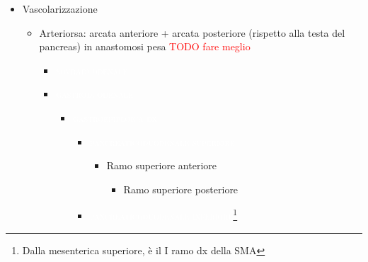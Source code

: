 \documentclass[italian,]{article}
\providecommand{\tightlist}{%
  \setlength{\itemsep}{0pt}\setlength{\parskip}{0pt}}
\newcommand{\mus}[1]{\colorbox{Salmon}{\textcolor{white}{\textsc{#1}}}}
\newcommand{\art}[1]{\colorbox{RedOrange}{\textcolor{white}{\textsc{#1}}}}
\renewcommand{\a}[1]{\underline{\textsc{#1}}}
\newcommand{\TODO}[1]{\textcolor{red}{\textsf{\footnotesize{TODO #1}}}} %
\begin{document}
\begin{itemize}
\begin{itemize}
    \begin{itemize}
    \tightlist
    \item
      \textbf{compasso aorto-mesenterico}: il duodeno passa tra
      \art{mesenterica superiore} e \art{aorta addominale}
    \end{itemize}
  \item
    \textbf{Porzione ascendente}

    \begin{itemize}
    \tightlist
    \item
      Fessura duodenodigiunale mantenuta in situ da un apparato
      sospensore, costituito principalmente dal
      \mus{muscolo di treiz}\footnote{Fibrocellule di provenienza
        diaframmatica che si attccano cranialmente sul gomito
        duodeno-digiunale + componente fibrosa, che costituisce anche
        l'impalcatura del \a{tripode celiaco}}
    \end{itemize}
  \end{itemize}
\item
  Vascolarizzazione

  \begin{itemize}
  \tightlist
  \item
    Arteriorsa: arcata anteriore + arcata posteriore (rispetto alla
    testa del pancreas) in anastomosi pesa \TODO{fare meglio}

    \begin{itemize}
    \item
      \art{sovraduodenale}
    \item
      \art{gastroduodenale}

      \begin{itemize}
      \item
        \art{gastroepiploica dx}

        \begin{itemize}
        \item
          \art{pancreaticoduodenale superiore}

          \begin{itemize}
          \tightlist
          \item
            Ramo superiore anteriore

            \begin{itemize}
            \tightlist
            \item
              Ramo superiore posteriore
            \end{itemize}
          \end{itemize}
        \item
          \art{pancreaticoduodenale inferiore}\footnote{Dalla
            mesenterica superiore, è il I ramo dx della SMA}


\end{itemize}
\end{itemize}
\end{itemize}
\end{itemize}
\end{itemize}
\end{document}
